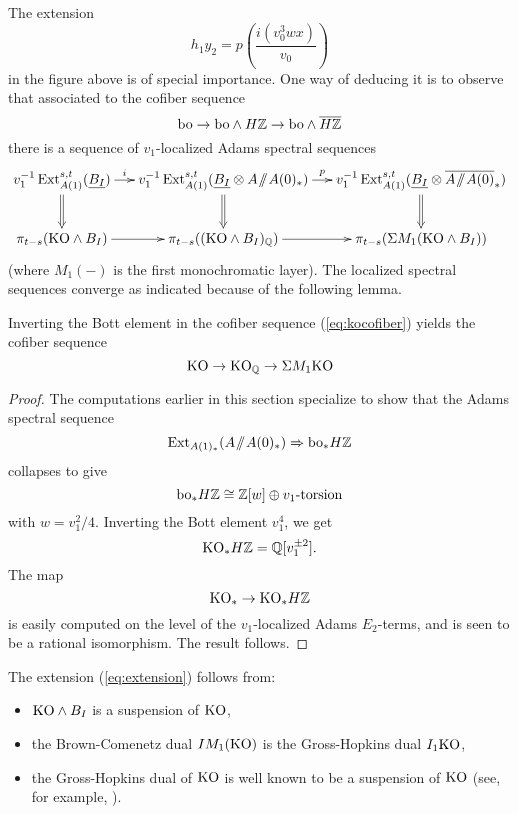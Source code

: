 The extension 
\begin{equation}\label{eq:extension} 
h_1 y_{2} = p \left( \frac{i(v_0^3wx)}{v_0} \right)
\end{equation}
in the figure above is of special importance.  One way of deducing it is to observe that associated to the cofiber sequence
\begin{equation}\label{eq:kocofiber}
\mathrm{bo} \rightarrow \mathrm{bo} \wedge H\mathbb{Z} \rightarrow \mathrm{bo} \wedge \overline{H\mathbb{Z}}
\end{equation}
there is a sequence of $v_1$-localized Adams spectral sequences
\[\xymatrix@C-1em{
v_1^{-1}\Ext^{s,t}_{A(1)}(\ull{B_I}) \ar[r]^-{i} \ar@{=>}[d] & 
v_1^{-1}\Ext^{s,t}_{A(1)}(\ull{B_I} \otimes A \mmod A(0)_*) \ar[r]^-p \ar@{=>}[d] &
v_1^{-1}\Ext^{s,t}_{A(1)}(\ull{B_I} \otimes \AA0) \ar@{=>}[d]
\\
\pi_{t-s} (\KO \wedge B_I) \ar[r] & 
\pi_{t-s} ((\KO \wedge B_I)_\QQ) \ar[r] &  
\pi_{t-s} (\Sigma M_1(\KO \wedge B_I)) 
}
\]
(where $M_1(-)$ is the first monochromatic layer). The localized spectral sequences converge as indicated because of the following lemma.

\begin{lem}
Inverting the Bott element in the cofiber sequence (\ref{eq:kocofiber}) yields the cofiber sequence
\[ \mathrm{KO} \rightarrow \mathrm{KO}_{\mathbb{Q}} \rightarrow \Sigma M_1\mathrm{KO} \]
\end{lem}

\begin{proof}
The computations earlier in this section specialize to show that the Adams spectral sequence
$$ \operatorname{Ext}_{A(1)_*}(A\! \sslash \! A(0)_*) \Rightarrow \mathrm{bo}_*H\mathbb{Z} $$
collapses to give
$$ \mathrm{bo}_*H\mathbb{Z} \cong \mathbb{Z}[w] \oplus \text{$v_1$-torsion} $$
with $w = v_1^2/4$.  Inverting the Bott element $v_1^4$, we get
$$ \mathrm{KO}_* H\mathbb{Z} = \mathbb{Q}[v_1^{\pm 2}]. $$
The map
$$ \mathrm{KO}_* \rightarrow \mathrm{KO}_*H\mathbb{Z} $$
is easily computed on the level of the $v_1$-localized Adams $E_2$-terms, and is seen to be a rational isomorphism.  The result follows.
\end{proof}

The extension (\ref{eq:extension}) follows from:
\begin{itemize}
\item $\mathrm{KO} \wedge B_I$ is a suspension of $\mathrm{KO}$,
\item the Brown-Comenetz dual $IM_1(\mathrm{KO})$ is the Gross-Hopkins dual $I_1\mathrm{KO}$,
\item the Gross-Hopkins dual of $\mathrm{KO}$ is well known to be a suspension of $\mathrm{KO}$ (see, for example, \cite[Cor.9.1]{HeardStojanoska}). 
\end{itemize}



